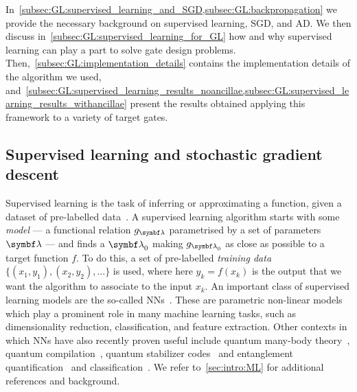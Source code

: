In~\cref{subsec:GL:supervised_learning_and_SGD,subsec:GL:backpropagation} we provide the necessary background on supervised learning, SGD, and AD. We then discuss in~\cref{subsec:GL:supervised_learning_for_GL} how and why supervised learning can play a part to solve gate design problems.
Then,~\cref{subsec:GL:implementation_details} contains the implementation details of the algorithm we used, and~\cref{subsec:GL:supervised_learning_results_noancillae,subsec:GL:supervised_learning_results_withancillae} present the results obtained applying this framework to a variety of target gates.

\subsection{Supervised learning and stochastic gradient descent}
\label{subsec:GL:supervised_learning_and_SGD}

Supervised learning is the task of inferring or approximating a function, given a dataset of pre-labelled data~\cite{bishop2006pattern,mohri2012foundations}.
A supervised learning algorithm starts with some \emph{model} --- a functional relation $g_{\bslambda}$ parametrised by a set of parameters $\bslambda$ --- and finds a $\bslambda_0$ making $g_{\bslambda_0}$ as close as possible to a target function $f$.
To do this, a set of pre-labelled \emph{training data} $\{ (x_1, y_1), (x_2,y_2), ...\}$ is used,
where here $y_k=f(x_k)$ is the output that we want the algorithm to associate to the input $x_k$.
An important class of supervised learning models are the so-called \acp{NN}~\cite{hechtnielsen1989theory,haykin1998neural}.
These are parametric non-linear models which play a prominent role in many machine learning tasks, such as dimensionality reduction, classification, and feature extraction.
Other contexts in which \acp{NN} have also recently proven useful include quantum many-body theory~\cite{amin2016quantum,wang2016discovering,hush2017machine,carleo2017solving,carrasquilla2017machine,torlai2017manybody,broecker2017quantum,deng2017quantum},
quantum compilation~\cite{swaddle2017generating}, quantum stabilizer codes~\cite{krastanov2017deep} and entanglement quantification~\cite{gray2018machinelearningassisted} and classification~\cite{harney2019entanglement}. We refer to~\cref{sec:intro:ML} for additional references and background.

